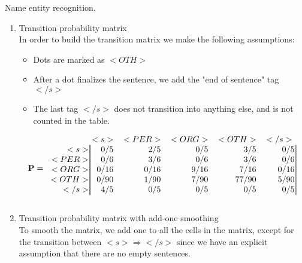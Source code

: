 \documentclass[12pt]{article}
\newenvironment{exercise}[2][Exercise]{\begin{trivlist}
\item[\hskip \labelsep {\bfseries #1}\hskip \labelsep {\bfseries #2.}]}{\end{trivlist}}
\begin{document}
\begin{exercise}{3. HMM Tagger} Name entity recognition.
	
\begin{enumerate}[label=(\alph*)]

\item Transition probability matrix \\

	In order to build the transition matrix we make the following assumptions:
    \begin{itemize}
    \item Dots are marked as $< OTH >$
    \item After a dot finalizes the sentence, we add the "end of sentence" tag $< /s >$
    \item The last tag $< /s >$ does not transition into anything else, and is not counted in the table.  
    \end{itemize}

\[
\mathbf{P} = 
        \begin{blockarray}{c@{\hspace{1pt}}rrrrr@{\hspace{3pt}}}
         & < s > & < PER > & < ORG > & < OTH > & < /s > \\
        \begin{block}{r@{\hspace{1pt}}|@{\hspace{1pt}}
    |@{\hspace{1pt}}rrrrr@{\hspace{1pt}}|@{\hspace{1pt}}|}
		< s >   & 0/5  & 2/5  & 0/5  & 3/5   & 0/5 \\
		< PER > & 0/6  & 3/6  & 0/6  & 3/6   & 0/6 \\
		< ORG > & 0/16 & 0/16 & 9/16 & 7/16  & 0/16 \\
		< OTH > & 0/90 & 1/90 & 7/90 & 77/90 & 5/90 \\
		< /s >  & 4/5  & 0/5  & 0/5  & 0/5   & 0/5 \\
        \end{block}
    \end{blockarray}
\]
		  
\item Transition probability matrix with add-one smoothing \\

	To smooth the matrix, we add one to all the cells in the matrix, except for the transition between $<s> \Rightarrow </s>$ since we have an explicit assumption that there are no empty sentences. \\


\end{enumerate}
\end{exercise}
\end{document}

